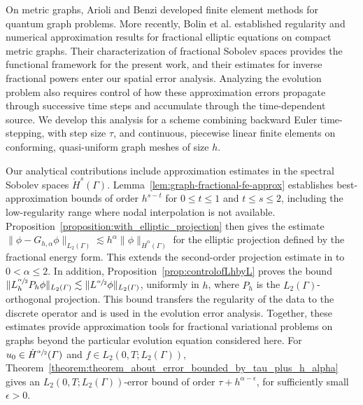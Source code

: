 \documentclass[numbers,webpdf]{ima-authoring-template}%
\theoremstyle{thmstyletwo}%
\numberwithin{equation}{section}
\begin{document}
On metric graphs, Arioli and Benzi \cite{arioli2018finite} developed finite element methods for quantum graph problems. More recently, Bolin et al. \cite{bolin2023regularity} established regularity and numerical approximation results for fractional elliptic equations on compact metric graphs. Their characterization of fractional Sobolev spaces provides the functional framework for the present work, and their estimates for inverse fractional powers enter our spatial error analysis. Analyzing the evolution problem also requires control of how these approximation errors propagate through successive time steps and accumulate through the time-dependent source. We develop this analysis for a scheme combining backward Euler time-stepping, with step size $\tau$, and continuous, piecewise linear finite elements on conforming, quasi-uniform graph meshes of size $h$.

Our analytical contributions include approximation estimates in the spectral Sobolev spaces $\dot H^s(\Gamma)$. Lemma~\ref{lem:graph-fractional-fe-approx} establishes best-approximation bounds of order $h^{s-t}$ for $0\leq t\leq1$ and $t\leq s\leq2$, including the low-regularity range where nodal interpolation is not available. Proposition~\ref{proposition:with_elliptic_projection} then gives the estimate $\|\phi-G_{h,\alpha}\phi\|_{L_2(\Gamma)}\lesssim h^\alpha\|\phi\|_{\dot H^\alpha(\Gamma)}$ for the elliptic projection defined by the fractional energy form. This extends the second-order projection estimate in \cite[Proposition~6.2]{bolin2023regularity} to $0<\alpha\leq2$. In addition, Proposition~\ref{prop:controlofLhbyL} proves the bound $\|L_h^{\sfrac{\alpha}{2}}P_h\phi\|_{L_2({\mit\varGamma})}\lesssim\|L^{\sfrac{\alpha}{2}}\phi\|_{L_2({\mit\varGamma})}$, uniformly in $h$, where $P_h$ is the $L_2(\Gamma)$-orthogonal projection. This bound transfers the regularity of the data to the discrete operator and is used in the evolution error analysis. Together, these estimates provide approximation tools for fractional variational problems on graphs beyond the particular evolution equation considered here. For $u_0\in\dot H^{\sfrac{\alpha}{2}}({\mit\varGamma})$ and $f\in L_2(0,T;L_2(\Gamma))$, Theorem~\ref{theorem:theorem_about_error_bounded_by_tau_plus_h_alpha} gives an $L_2(0,T;L_2(\Gamma))$-error bound of order $\tau+h^{\alpha-\epsilon}$, for sufficiently small $\epsilon>0$. 
\end{document}
